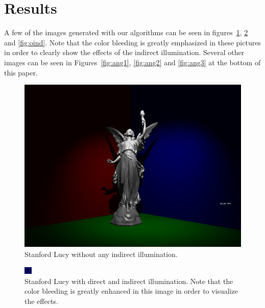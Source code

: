 \documentclass{acmsiggraph}               %
\begin{document}
\section{Results}
A few of the images generated with our algorithms can be seen in figures~\ref{fig:noind}, \ref{fig:daind} and \ref{fig:oind}. Note that the color bleeding is greatly emphasized in these pictures in order to clearly show the effects of the indirect illumination. Several other images can be seen in Figures~\ref{fig:ang1}, \ref{fig:ang2} and \ref{fig:ang3} at the bottom of this paper.

\begin{figure}[tb]
    \centering
    \includegraphics[width=0.7\columnwidth]{./images/p1-A.png}
    \caption{Stanford Lucy without any indirect illumination.}
    \label{fig:noind}
\end{figure}

\begin{figure}[tb]
    \centering
    \includegraphics[width=0.7\columnwidth]{./images/p1-B.png}
    \caption{Stanford Lucy with direct and indirect illumination. Note that the color bleeding is greatly enhanced in this image in order to visualize the effects.}
    \label{fig:daind}
\end{figure}
\end{document}
